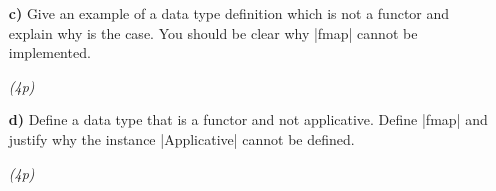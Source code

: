 \documentclass[a4,11pt]{article}
\newif\ifsol
\newcommand{\points}[1]{\hfill \textsl{({#1}p)}}
\begin{document}
\begin{enumerate}
\item[\textbf{c)}] Give an example of a data type definition which is not a
  functor and explain why is the case.
%
  You should be clear why |fmap| cannot be implemented.

  \ifsol
  \begin{code}

   -- The a is in negative position, so fmap cannot apply the function since
   -- there is no a
   data F a = F (a -> ())
  \end{code}
  \fi

  \points{4}

\item[\textbf{d)}] Define a data type that is a functor and not applicative. %
Define |fmap| and justify why the instance |Applicative| cannot be defined.

  \ifsol
  \begin{code}
    data Pair r a = Pair r a

    instance Functor (Pair r) where
      -- possible

    instance Applicative (Pair r) where
      pure a = -- The pair cannot be built since pure receives an a
               -- but it also needs an r, which does not receive.
  \end{code}
  \fi
 \points{4}
\end{enumerate}
\end{document}
